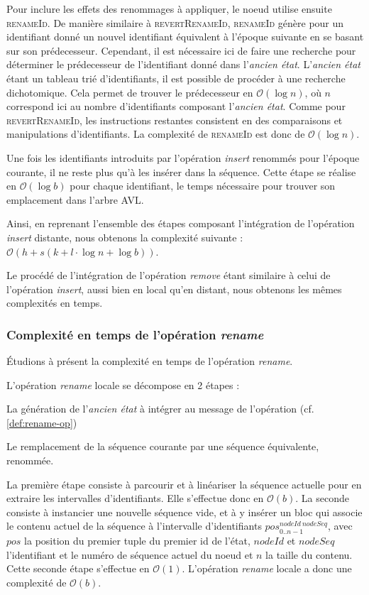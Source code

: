 \documentclass[12pt]{thesul}
\newcommand{\trm}[1]{\mathit{#1}}
\newcommand{\id}[3]{$\trm{#1}^{\trm{#2}}_{\trm{#3}}$}
\newcommand\bigO[1]{$\mathcal{O}(#1)$}
\begin{document}
Pour inclure les effets des renommages à appliquer, le noeud utilise ensuite \textsc{renameId}.
De manière similaire à \textsc{revertRenameId}, \textsc{renameId} génère pour un identifiant donné un nouvel identifiant équivalent à l'époque suivante en se basant sur son prédecesseur.
Cependant, il est nécessaire ici de faire une recherche pour déterminer le prédecesseur de l'identifiant donné dans l'\emph{ancien état}.
L'\emph{ancien état} étant un tableau trié d'identifiants, il est possible de procéder à une recherche dichotomique.
Cela permet de trouver le prédecesseur en \bigO{\log{}n}, où $n$ correspond ici au nombre d'identifiants composant l'\emph{ancien état}.
Comme pour \textsc{revertRenameId}, les instructions restantes consistent en des comparaisons et manipulations d'identifiants.
La complexité de \textsc{renameId} est donc de \bigO{\log{}n}.

Une fois les identifiants introduits par l'opération \emph{insert} renommés pour l'époque courante, il ne reste plus qu'à les insérer dans la séquence.
Cette étape se réalise en \bigO{\log{}b} pour chaque identifiant, le temps nécessaire pour trouver son emplacement dans l'arbre AVL.

Ainsi, en reprenant l'ensemble des étapes composant l'intégration de l'opération \emph{insert} distante, nous obtenons la complexité suivante : \bigO{h + s (k + l \cdot \log{}n + \log{}b)}.

Le procédé de l'intégration de l'opération \emph{remove} étant similaire à celui de l'opération \emph{insert}, aussi bien en local qu'en distant, nous obtenons les mêmes complexités en temps.

\subsubsection{Complexité en temps de l'opération \emph{rename}}

Étudions à présent la complexité en temps de l'opération \emph{rename}.

L'opération \emph{rename} locale se décompose en 2 étapes :
\begin{enumerate*}[label=(\roman*)]
  \item La génération de l'\emph{ancien état} à intégrer au message de l'opération (cf. \autoref{def:rename-op})
  \item Le remplacement de la séquence courante par une séquence équivalente, renommée.
\end{enumerate*}
La première étape consiste à parcourir et à linéariser la séquence actuelle pour en extraire les intervalles d'identifiants.
Elle s'effectue donc en \bigO{b}.
La seconde consiste à instancier une nouvelle séquence vide, et à y insérer un bloc qui associe le contenu actuel de la séquence à l'intervalle d'identifiants \id{pos}{nodeId~nodeSeq}{0..n-1}, avec $\trm{pos}$ la position du premier tuple du premier id de l'état, $\trm{nodeId}$ et $\trm{nodeSeq}$ l'identifiant et le numéro de séquence actuel du noeud et $\trm{n}$ la taille du contenu.
Cette seconde étape s'effectue en \bigO{1}.
L'opération \emph{rename} locale a donc une complexité de \bigO{b}.
\end{document}
